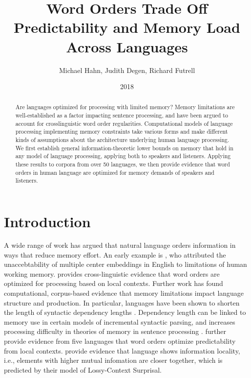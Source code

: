 \documentclass[11pt,letterpaper]{article}
\title{Word Orders Trade Off Predictability and Memory Load Across Languages}%
\author{Michael Hahn, Judith Degen, Richard Futrell}
\date{2018}
\newcounter{theorem}
\newtheorem{thm}[theorem]{Theorem}
\begin{document}
\maketitle


%
\begin{abstract}

Are languages optimized for processing with limited memory?
Memory limitations are well-established as a factor impacting sentence processing, and have been argued to account for crosslinguistic word order regularities.
Computational models of language processing implementing memory constraints take various forms and make different kinds of assumptions about the architecture underlying human language processing.
We first  establish general information-theoretic lower bounds on memory that hold in any model of language processing, applying both to speakers and listeners. %
Applying these results to corpora from over 50 languages, we then provide evidence that word orders in human language are optimized for memory demands of speakers and listeners. %
\end{abstract}


%
%
%


\section{Introduction}

A wide range of work has argued that natural language orders information in ways that reduce memory effort.
An early example is \cite{miller-finitary-1963}, who attributed the unaccebtability of multiple center embeddings in English to limitations of human working memory.
\cite{hawkins-efficiency-2003} provides cross-linguistic evidence that word orders are optimized for processing based on local contexts.
Further work has found computational, corpus-based evidence that memory limitations impact language structure and production.
In particular, languages have been shown to shorten the length of syntactic dependency lengths \citep{futrell-large-scale-2015}.
Dependency length can be linked to memory use in certain models of incremental syntactic parsing, and increases processing difficulty in theories of memory in sentence processing \citep{gibson-linguistic-1998}.
\cite{gildea-human-2015} further provide evidence from five languages that word orders optimize predictability from local contexts.
\cite{futrell-noisy-context-2017} provide evidence that language shows information locality, i.e., elements with higher mutual infomation are closer together, which is predicted by their model of Lossy-Context Surprisal.
\end{document}
